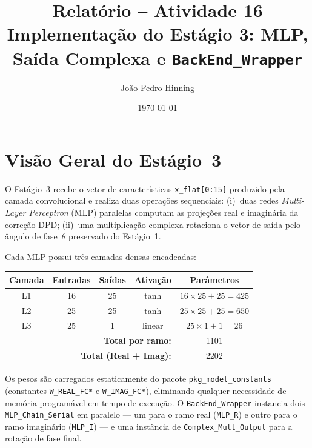\documentclass[a4paper,12pt]{article}
\title{Relat\'orio -- Atividade 16 \\
       \large Implementa\c{c}\~ao do Est\'agio 3: MLP, Sa\'ida Complexa e \texttt{BackEnd\_Wrapper}}
\author{Jo\~ao Pedro Hinning}
\date{\today}
\begin{document}
\maketitle
\thispagestyle{fancy}

\section{Vis\~ao Geral do Est\'agio~3}

O Est\'agio~3 recebe o vetor de caracter\'isticas \texttt{x\_flat[0:15]} produzido pela camada convolucional e realiza duas opera\c{c}\~oes sequenciais: (i)~duas redes \textit{Multi-Layer Perceptron} (MLP) paralelas computam as proje\c{c}\~oes real e imagin\'aria da corre\c{c}\~ao DPD; (ii)~uma multiplica\c{c}\~ao complexa rotaciona o vetor de sa\'ida pelo \^angulo de fase~$\theta$ preservado do Est\'agio~1.

Cada MLP possui tr\^es camadas densas encadeadas:

\begin{center}
\small
\begin{tabular}{ccccc}
\hline
\textbf{Camada} & \textbf{Entradas} & \textbf{Sa\'idas} & \textbf{Ativa\c{c}\~ao} & \textbf{Par\^ametros} \\
\hline
L1 & 16 & 25 & tanh & $16 \times 25 + 25 = 425$ \\
L2 & 25 & 25 & tanh & $25 \times 25 + 25 = 650$ \\
L3 & 25 &  1 & linear & $25 \times 1 + 1 = 26$ \\
\hline
\multicolumn{4}{r}{\textbf{Total por ramo:}} & 1101 \\
\multicolumn{4}{r}{\textbf{Total (Real + Imag):}} & 2202 \\
\hline
\end{tabular}
\end{center}

Os pesos s\~ao carregados estaticamente do pacote \texttt{pkg\_model\_constants} (constantes \texttt{W\_REAL\_FC*} e \texttt{W\_IMAG\_FC*}), eliminando qualquer necessidade de mem\'oria program\'avel em tempo de execu\c{c}\~ao. O \texttt{BackEnd\_Wrapper} instancia dois \texttt{MLP\_Chain\_Serial} em paralelo --- um para o ramo real (\texttt{MLP\_R}) e outro para o ramo imagin\'ario (\texttt{MLP\_I}) --- e uma inst\^ancia de \texttt{Complex\_Mult\_Output} para a rota\c{c}\~ao de fase final.
\end{document}

